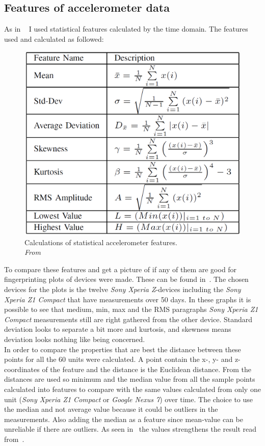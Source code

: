 \subsection{Features of accelerometer data}\label{sec:featuresAcc}
As in ~\cite{sensor:accelPrint} I used statistical features calculated by the time domain. The features used and calculated as followed:
\begin{figure}[ht]
	\centering
	\includegraphics[scale=.35]{img/featureCalc}
	\caption{Calculations of statistical accelerometer features. \\\textit{From~\cite[p.6]{sensor:accelPrint}}}
	\label{fig:accFeatures}
\end{figure}
To compare these features and get a picture of if any of them are good for fingerprinting plots of devices were made. These can be found in~. The chosen devices for the plots is the twelve \textit{Sony Xperia Z}-devices including the \textit{Sony Xperia Z1 Compact} that have measurements over 50 days. In these graphs it is possible to see that medium, min, max and the RMS paragraphs \textit{Sony Xperia Z1 Compact} measurements still are right gathered from the other device. Standard deviation looks to separate a bit more and kurtosis, and skewness means deviation looks nothing like being concerned.\\
In order to compare the properties that are best the distance between these points for all the 60 units were calculated. A point contain the x-, y- and z-coordinates of the feature and the distance is the Euclidean distance. From the distances are used so minimum and the median value from all the sample points calculated into features to compare with the same values calculated from only one unit (\textit{Sony Xperia Z1 Compact} or \textit{Google Nexus 7}) over time. The choice to use the median and not average value because it could be outliers in the measurements. Also adding the median as a feature since mean-value can be unreliable if there are outliers. As seen in~ the values strengthens the result read from~.

